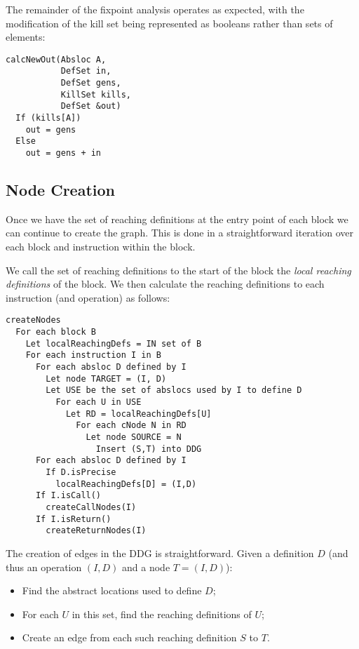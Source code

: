 \documentclass[11pt]{article}
\begin{document}
The remainder of the fixpoint analysis operates as expected, with the
modification of the kill set being represented as booleans rather than
sets of elements:

\begin{verbatim}
calcNewOut(Absloc A,
           DefSet in,
           DefSet gens,
           KillSet kills,
           DefSet &out) 
  If (kills[A])
    out = gens
  Else
    out = gens + in
\end{verbatim}


\subsection*{Node Creation}

Once we have the set of reaching definitions at the entry point of
each block we can continue to create the graph. This is done in a
straightforward iteration over each block and instruction within the
block. 

We call the set of reaching definitions to the start of the block the
\emph{local reaching definitions} of the block. We then calculate the
reaching definitions to each instruction (and operation) as follows:

\begin{verbatim}
createNodes
  For each block B
    Let localReachingDefs = IN set of B
    For each instruction I in B
      For each absloc D defined by I
        Let node TARGET = (I, D)
        Let USE be the set of abslocs used by I to define D
          For each U in USE
            Let RD = localReachingDefs[U]
              For each cNode N in RD
                Let node SOURCE = N
                  Insert (S,T) into DDG
      For each absloc D defined by I
        If D.isPrecise
          localReachingDefs[D] = (I,D)
      If I.isCall()
        createCallNodes(I)
      If I.isReturn()
        createReturnNodes(I)
\end{verbatim}

The creation of edges in the DDG is straightforward. Given a
definition $D$ (and thus an operation $(I,D)$ and a node $T = (I,D)$):
\begin{itemize}
\item Find the abstract locations used to define $D$;
\item For each $U$ in this set, find the reaching definitions of $U$;
\item Create an edge from each such reaching definition $S$ to $T$.
\end{itemize}
\end{document}
